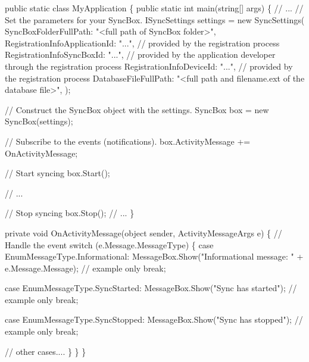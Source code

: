 \begin{DoxyCode}
\textcolor{keyword}{public} \textcolor{keyword}{static} \textcolor{keyword}{class }MyApplication
\{
    \textcolor{keyword}{public} \textcolor{keyword}{static} \textcolor{keywordtype}{int} main(\textcolor{keywordtype}{string}[] args)
    \{
        \textcolor{comment}{// ...}
        \textcolor{comment}{// Set the parameters for your SyncBox.}
        ISyncSettings settings = \textcolor{keyword}{new} SyncSettings(
            SyncBoxFolderFullPath: \textcolor{stringliteral}{"<full path of SyncBox folder>"},
            RegistrationInfoApplicationId: \textcolor{stringliteral}{"..."},   \textcolor{comment}{// provided by the
       registration process}
            RegistrationInfoSyncBoxId: \textcolor{stringliteral}{"..."},       \textcolor{comment}{// provided by the
       application developer through the registration process}
            RegistrationInfoDeviceId: \textcolor{stringliteral}{"..."},        \textcolor{comment}{// provided by the
       registration process}
            DatabaseFileFullPath: \textcolor{stringliteral}{"<full path and filename.ext of the database
       file>"},
                );
        
        \textcolor{comment}{// Construct the SyncBox object with the settings.}
        SyncBox box = \textcolor{keyword}{new} SyncBox(settings);

        \textcolor{comment}{// Subscribe to the events (notifications).}
        box.ActivityMessage += OnActivityMessage;
    
        \textcolor{comment}{// Start syncing}
        box.Start(); 
    
        \textcolor{comment}{// ...}
    
        \textcolor{comment}{// Stop syncing}
        box.Stop();
        \textcolor{comment}{// ...}
    \}

    \textcolor{keyword}{private} \textcolor{keywordtype}{void} OnActivityMessage(\textcolor{keywordtype}{object} sender, ActivityMessageArgs e)
    \{
        \textcolor{comment}{// Handle the event}
        \textcolor{keywordflow}{switch} (e.Message.MessageType)
        \{
            \textcolor{keywordflow}{case} EnumMessageType.Informational:
                MessageBox.Show(\textcolor{stringliteral}{"Informational message: "} + e.Message.Message);
        \textcolor{comment}{// example only}
                \textcolor{keywordflow}{break};

            \textcolor{keywordflow}{case} EnumMessageType.SyncStarted:
                MessageBox.Show(\textcolor{stringliteral}{"Sync has started"});    \textcolor{comment}{// example only}
                \textcolor{keywordflow}{break};

            \textcolor{keywordflow}{case} EnumMessageType.SyncStopped:
                MessageBox.Show(\textcolor{stringliteral}{"Sync has stopped"});    \textcolor{comment}{// example only}
                \textcolor{keywordflow}{break};

            \textcolor{comment}{// other cases....}
        \}
    \}
\}
\end{DoxyCode}


